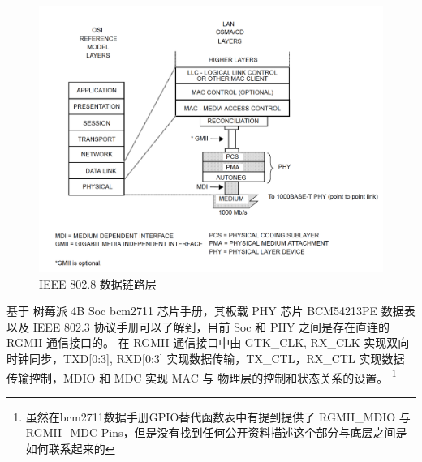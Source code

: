     \begin{figure}[ht]
        \centering
        \includegraphics[scale=0.4]{imgs/data_link_layers.jpg}
        \caption{IEEE 802.8 数据链路层}    \label{fig::dataLink}
    \end{figure}

    基于 树莓派 4B Soc bcm2711 芯片手册，其板载 PHY 芯片 BCM54213PE 数据表以及 IEEE 802.3 协议手册可以了解到，目前 Soc 和 PHY 之间是存在直连的 RGMII 通信接口的。
    在 RGMII 通信接口中由 GTK\_CLK, RX\_CLK 实现双向时钟同步，TXD[0:3], RXD[0:3] 实现数据传输，TX\_CTL，RX\_CTL 实现数据传输控制，MDIO 和 MDC 实现 MAC 与 物理层的控制和状态关系的设置。
    \footnote{虽然在bcm2711数据手册GPIO替代函数表中有提到提供了 RGMII\_MDIO 与 RGMII\_MDC Pins，但是没有找到任何公开资料描述这个部分与底层之间是如何联系起来的}




